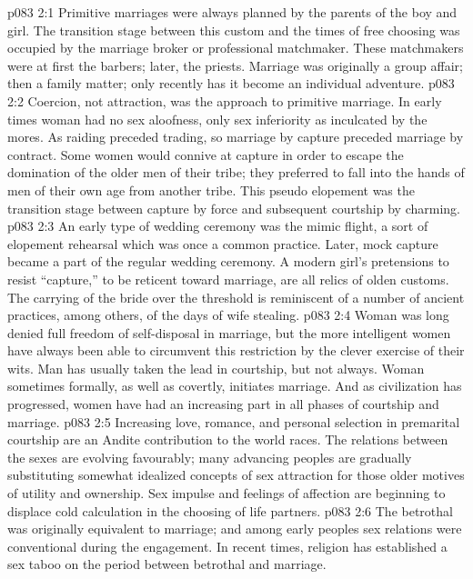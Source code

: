 \vs p083 2:1 Primitive marriages were always planned by the parents of the boy and girl. The transition stage between this custom and the times of free choosing was occupied by the marriage broker or professional matchmaker. These matchmakers were at first the barbers; later, the priests. Marriage was originally a group affair; then a family matter; only recently has it become an individual adventure.
\vs p083 2:2 Coercion, not attraction, was the approach to primitive marriage. In early times woman had no sex aloofness, only sex inferiority as inculcated by the mores. As raiding preceded trading, so marriage by capture preceded marriage by contract. Some women would connive at capture in order to escape the domination of the older men of their tribe; they preferred to fall into the hands of men of their own age from another tribe. This pseudo elopement was the transition stage between capture by force and subsequent courtship by charming.
\vs p083 2:3 An early type of wedding ceremony was the mimic flight, a sort of elopement rehearsal which was once a common practice. Later, mock capture became a part of the regular wedding ceremony. A modern girl’s pretensions to resist “capture,” to be reticent toward marriage, are all relics of olden customs. The carrying of the bride over the threshold is reminiscent of a number of ancient practices, among others, of the days of wife stealing.
\vs p083 2:4 Woman was long denied full freedom of self\hyp{}disposal in marriage, but the more intelligent women have always been able to circumvent this restriction by the clever exercise of their wits. Man has usually taken the lead in courtship, but not always. Woman sometimes formally, as well as covertly, initiates marriage. And as civilization has progressed, women have had an increasing part in all phases of courtship and marriage.
\vs p083 2:5 Increasing love, romance, and personal selection in premarital courtship are an Andite contribution to the world races. The relations between the sexes are evolving favourably; many advancing peoples are gradually substituting somewhat idealized concepts of sex attraction for those older motives of utility and ownership. Sex impulse and feelings of affection are beginning to displace cold calculation in the choosing of life partners.
\vs p083 2:6 The betrothal was originally equivalent to marriage; and among early peoples sex relations were conventional during the engagement. In recent times, religion has established a sex taboo on the period between betrothal and marriage.
